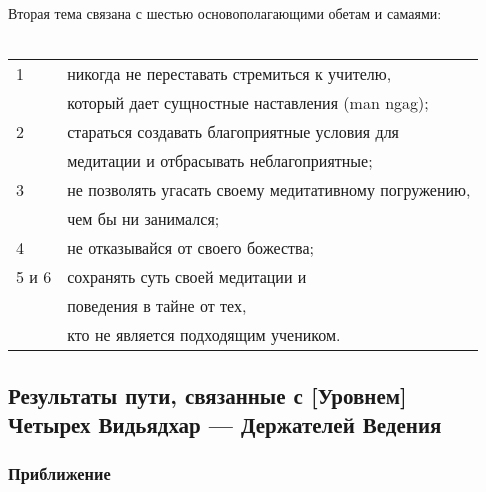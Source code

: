 Вторая тема связана с шестью основополагающими обетам и самаями:\\
\\
\begin{tabular}{ll}
1 & никогда не переставать стремиться к учителю, \\
  & который дает сущностные наставления (man ngag);\\
2 & стараться создавать благоприятные условия для \\
  & медитации и отбрасывать неблагоприятные;\\
3 & не позволять угасать своему медитативному погружению, \\
  & чем бы ни занимался; \\
4 & не отказывайся от своего божества; \\
5 и 6 & сохранять суть своей медитации и \\
  & поведения в тайне от тех, \\
  & кто не является подходящим учеником.
\end{tabular}

\subsection{Результаты пути, связанные с [Уровнем] \\ Четырех Видьядхар — Держателей Ведения}

\subsubsection{Приближение}


